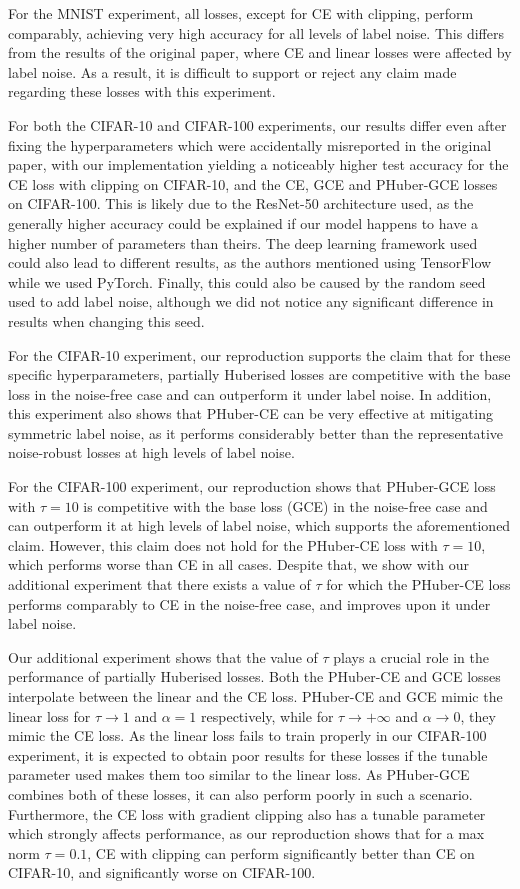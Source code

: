 For the MNIST experiment, all losses, except for CE with clipping, perform comparably, achieving very high accuracy for all levels of label noise. This differs from the results of the original paper, where CE and linear losses were affected by label noise. As a result, it is difficult to support or reject any claim made regarding these losses with this experiment.

For both the CIFAR-10 and CIFAR-100 experiments, our results differ even after fixing the hyperparameters which were accidentally misreported in the original paper, with our implementation yielding a noticeably higher test accuracy for the CE loss with clipping on CIFAR-10, and the CE, GCE and PHuber-GCE losses on CIFAR-100. This is likely due to the ResNet-50 architecture used, as the generally higher accuracy could be explained if our model happens to have a higher number of parameters than theirs. The deep learning framework used could also lead to different results, as the authors mentioned using TensorFlow while we used PyTorch. Finally, this could also be caused by the random seed used to add label noise, although we did not notice any significant difference in results when changing this seed.

For the CIFAR-10 experiment, our reproduction supports the claim that for these specific hyperparameters, partially Huberised losses are competitive with the base loss in the noise-free case and can outperform it under label noise. In addition, this experiment also shows that PHuber-CE can be very effective at mitigating symmetric label noise, as it performs considerably better than the representative noise-robust losses at high levels of label noise. 

For the CIFAR-100 experiment, our reproduction shows that PHuber-GCE loss with $\tau=10$ is competitive with the base loss (GCE) in the noise-free case and can outperform it at high levels of label noise, which supports the aforementioned claim. However, this claim does not hold for the PHuber-CE loss with $\tau=10$, which performs worse than CE in all cases. Despite that, we show with our additional experiment that there exists a value of $\tau$ for which the PHuber-CE loss performs comparably to CE in the noise-free case, and improves upon it under label noise.

Our additional experiment shows that the value of $\tau$ plays a crucial role in the performance of partially Huberised losses. Both the PHuber-CE and GCE losses interpolate between the linear and the CE loss. PHuber-CE and GCE mimic the linear loss for $\tau \rightarrow 1$ and $\alpha = 1$ respectively, while for $\tau \rightarrow +\infty$ and $\alpha \rightarrow 0$, they mimic the CE loss. As the linear loss fails to train properly in our CIFAR-100 experiment, it is expected to obtain poor results for these losses if the tunable parameter used makes them too similar to the linear loss. As PHuber-GCE combines both of these losses, it can also perform poorly in such a scenario. Furthermore, the CE loss with gradient clipping also has a tunable parameter which strongly affects performance, as our reproduction shows that for a max norm $\tau=0.1$, CE with clipping can perform significantly better than CE on CIFAR-10, and significantly worse on CIFAR-100.

